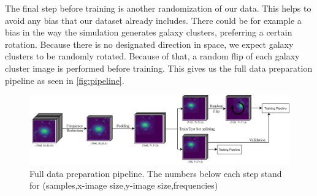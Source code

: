 The final step before training is another randomization of our data. This helps to avoid any bias that our dataset already includes. There could be for example a bias in the way the simulation generates galaxy clusters, preferring a certain rotation. Because there is no designated direction in space, we expect galaxy clusters to be randomly rotated. Because of that, a random flip of each galaxy cluster image is performed before training.
This gives us the full data preparation pipeline as seen in \autoref{fig:pipeline}.

\begin{figure}[H]
\centering
\includegraphics[width=\linewidth]{images/Chapter3/pipeline.png}
\caption{Full data preparation pipeline. The numbers below each step stand for (samples,x-image size,y-image size,frequencies)} 
\label{fig:pipeline}
\end{figure}